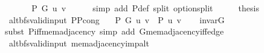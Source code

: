 \begin{isabellebody}
\ \ \isamarkupfalse%
\ \isamarkupfalse%
\ {\isachardoublequoteopen}{\isachardot}{\kern0pt}{\isachardot}{\kern0pt}{\isachardot}{\kern0pt}\ {\isasymlongleftrightarrow}\ P\ G\ u\ v{\isachardoublequoteclose}\isanewline
\ \ \ \ \isamarkupfalse%
\ {\isacharparenleft}{\kern0pt}simp\ add{\isacharcolon}{\kern0pt}\ P{\isacharunderscore}{\kern0pt}def\ split{\isacharcolon}{\kern0pt}\ option{\isachardot}{\kern0pt}split{\isacharparenright}{\kern0pt}\isanewline
\ \ \isamarkupfalse%
\ \isamarkupfalse%
\ {\isacharquery}{\kern0pt}thesis\isanewline
\ \ \ \ \isacommand{{\isachardot}{\kern0pt}{\isachardot}{\kern0pt}}\isamarkupfalse%
\isanewline
{}\isamarkupfalse%
%
\endisatagproof
{\isafoldproof}%
%
\isadelimproof
\isanewline
%
\endisadelimproof
%
\isadeliminvisible
\isanewline
%
\endisadeliminvisible
%
\isataginvisible
{}\isamarkupfalse%
\ {\isacharparenleft}{\kern0pt}\ alt{\isacharunderscore}{\kern0pt}bfs{\isacharunderscore}{\kern0pt}valid{\isacharunderscore}{\kern0pt}input{\isacharparenright}{\kern0pt}\ P{\isacharunderscore}{\kern0pt}P{\isacharprime}{\kern0pt}{\isacharprime}{\kern0pt}{\isacharunderscore}{\kern0pt}cong{\isacharcolon}{\kern0pt}\isanewline
\ \ \ {\isachardoublequoteopen}P\ G{}\ u\ v\ {\isasymlongleftrightarrow}\ P{\isacharprime}{\kern0pt}{\isacharprime}{\kern0pt}\ {\isacharbraceleft}{\kern0pt}u{\isacharcomma}{\kern0pt}\ v{\isacharbraceright}{\kern0pt}{\isachardoublequoteclose}%
\endisataginvisible
{\isafoldinvisible}%
%
\isadeliminvisible
\isanewline
%
\endisadeliminvisible
%
\isadelimproof
\ \ %
\endisadelimproof
%
\isatagproof
{}\isamarkupfalse%
\ invar{\isacharunderscore}{\kern0pt}G{}\isanewline
\ \ \isamarkupfalse%
\ {\isacharparenleft}{\kern0pt}subst\ P{\isacharunderscore}{\kern0pt}iff{\isacharunderscore}{\kern0pt}mem{\isacharunderscore}{\kern0pt}adjacency{\isacharparenright}{\kern0pt}\ {\isacharparenleft}{\kern0pt}simp\ add{\isacharcolon}{\kern0pt}\ G{}{\isachardot}{\kern0pt}mem{\isacharunderscore}{\kern0pt}adjacency{\isacharunderscore}{\kern0pt}iff{\isacharunderscore}{\kern0pt}edge{\isacharparenright}{\kern0pt}{\isacharplus}{\kern0pt}%
\endisatagproof
{\isafoldproof}%
%
\isadelimproof
\isanewline
%
\endisadelimproof
%
\isadeliminvisible
\isanewline
%
\endisadeliminvisible
%
\isataginvisible
{}\isamarkupfalse%
\ {\isacharparenleft}{\kern0pt}\ alt{\isacharunderscore}{\kern0pt}bfs{\isacharunderscore}{\kern0pt}valid{\isacharunderscore}{\kern0pt}input{\isacharparenright}{\kern0pt}\ mem{\isacharunderscore}{\kern0pt}adjacency{\isacharunderscore}{\kern0pt}imp{\isacharunderscore}{\kern0pt}alt{\isacharcolon}{\kern0pt}\isanewline

\end{isabellebody}
